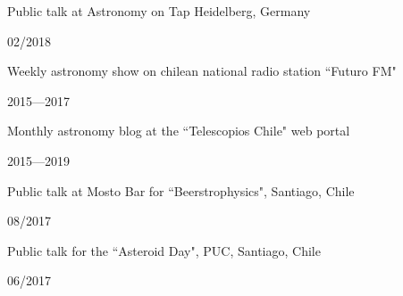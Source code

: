 \documentclass[12pt, a4paper]{article} %
\begin{document}
\begin{minipage}[t]{0.7\textwidth}
\begin{flushleft}%
  \setlength{\leftskip}{0.2cm}%
Public talk at Astronomy on Tap Heidelberg, Germany 
\end{flushleft}
\end{minipage}
\begin{minipage}[t]{0.3\textwidth}
\hfill 02/2018
\end{minipage}

\vspace{0.2cm}

\begin{minipage}[t]{0.7\textwidth}
\begin{flushleft}%
  \setlength{\leftskip}{0.2cm}%
Weekly astronomy show on chilean national radio station ``Futuro FM"
\end{flushleft}
\end{minipage}
\begin{minipage}[t]{0.3\textwidth}
\hfill 2015---2017
\end{minipage}


\vspace{0.2cm}

\begin{minipage}[t]{0.7\textwidth}
\begin{flushleft}%
  \setlength{\leftskip}{0.2cm}%
Monthly astronomy blog at the ``Telescopios Chile" web portal
\end{flushleft}
\end{minipage}
\begin{minipage}[t]{0.3\textwidth}
\hfill 2015---2019
\end{minipage}

\vspace{0.2cm}

\begin{minipage}[t]{0.7\textwidth}
\begin{flushleft}%
  \setlength{\leftskip}{0.2cm}%
Public talk at Mosto Bar for ``Beerstrophysics", Santiago, Chile
\end{flushleft}
\end{minipage}
\begin{minipage}[t]{0.3\textwidth}
\hfill 08/2017
\end{minipage}

\vspace{0.2cm}

\begin{minipage}[t]{0.7\textwidth}
\begin{flushleft}%
  \setlength{\leftskip}{0.2cm}%
Public talk for the ``Asteroid Day", PUC, Santiago, Chile
\end{flushleft}
\end{minipage}
\begin{minipage}[t]{0.3\textwidth}
\hfill 06/2017
\end{minipage}
\end{document}
